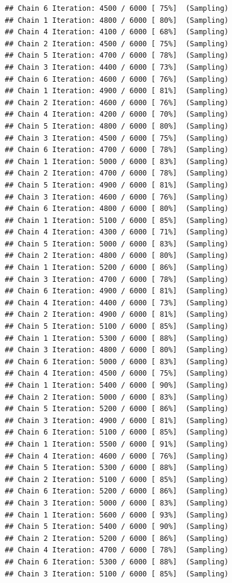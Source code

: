 \documentclass[
]{article}
\begin{document}
\begin{verbatim}
## Chain 6 Iteration: 4500 / 6000 [ 75%]  (Sampling) 
## Chain 1 Iteration: 4800 / 6000 [ 80%]  (Sampling) 
## Chain 4 Iteration: 4100 / 6000 [ 68%]  (Sampling) 
## Chain 2 Iteration: 4500 / 6000 [ 75%]  (Sampling) 
## Chain 5 Iteration: 4700 / 6000 [ 78%]  (Sampling) 
## Chain 3 Iteration: 4400 / 6000 [ 73%]  (Sampling) 
## Chain 6 Iteration: 4600 / 6000 [ 76%]  (Sampling) 
## Chain 1 Iteration: 4900 / 6000 [ 81%]  (Sampling) 
## Chain 2 Iteration: 4600 / 6000 [ 76%]  (Sampling) 
## Chain 4 Iteration: 4200 / 6000 [ 70%]  (Sampling) 
## Chain 5 Iteration: 4800 / 6000 [ 80%]  (Sampling) 
## Chain 3 Iteration: 4500 / 6000 [ 75%]  (Sampling) 
## Chain 6 Iteration: 4700 / 6000 [ 78%]  (Sampling) 
## Chain 1 Iteration: 5000 / 6000 [ 83%]  (Sampling) 
## Chain 2 Iteration: 4700 / 6000 [ 78%]  (Sampling) 
## Chain 5 Iteration: 4900 / 6000 [ 81%]  (Sampling) 
## Chain 3 Iteration: 4600 / 6000 [ 76%]  (Sampling) 
## Chain 6 Iteration: 4800 / 6000 [ 80%]  (Sampling) 
## Chain 1 Iteration: 5100 / 6000 [ 85%]  (Sampling) 
## Chain 4 Iteration: 4300 / 6000 [ 71%]  (Sampling) 
## Chain 5 Iteration: 5000 / 6000 [ 83%]  (Sampling) 
## Chain 2 Iteration: 4800 / 6000 [ 80%]  (Sampling) 
## Chain 1 Iteration: 5200 / 6000 [ 86%]  (Sampling) 
## Chain 3 Iteration: 4700 / 6000 [ 78%]  (Sampling) 
## Chain 6 Iteration: 4900 / 6000 [ 81%]  (Sampling) 
## Chain 4 Iteration: 4400 / 6000 [ 73%]  (Sampling) 
## Chain 2 Iteration: 4900 / 6000 [ 81%]  (Sampling) 
## Chain 5 Iteration: 5100 / 6000 [ 85%]  (Sampling) 
## Chain 1 Iteration: 5300 / 6000 [ 88%]  (Sampling) 
## Chain 3 Iteration: 4800 / 6000 [ 80%]  (Sampling) 
## Chain 6 Iteration: 5000 / 6000 [ 83%]  (Sampling) 
## Chain 4 Iteration: 4500 / 6000 [ 75%]  (Sampling) 
## Chain 1 Iteration: 5400 / 6000 [ 90%]  (Sampling) 
## Chain 2 Iteration: 5000 / 6000 [ 83%]  (Sampling) 
## Chain 5 Iteration: 5200 / 6000 [ 86%]  (Sampling) 
## Chain 3 Iteration: 4900 / 6000 [ 81%]  (Sampling) 
## Chain 6 Iteration: 5100 / 6000 [ 85%]  (Sampling) 
## Chain 1 Iteration: 5500 / 6000 [ 91%]  (Sampling) 
## Chain 4 Iteration: 4600 / 6000 [ 76%]  (Sampling) 
## Chain 5 Iteration: 5300 / 6000 [ 88%]  (Sampling) 
## Chain 2 Iteration: 5100 / 6000 [ 85%]  (Sampling) 
## Chain 6 Iteration: 5200 / 6000 [ 86%]  (Sampling) 
## Chain 3 Iteration: 5000 / 6000 [ 83%]  (Sampling) 
## Chain 1 Iteration: 5600 / 6000 [ 93%]  (Sampling) 
## Chain 5 Iteration: 5400 / 6000 [ 90%]  (Sampling) 
## Chain 2 Iteration: 5200 / 6000 [ 86%]  (Sampling) 
## Chain 4 Iteration: 4700 / 6000 [ 78%]  (Sampling) 
## Chain 6 Iteration: 5300 / 6000 [ 88%]  (Sampling) 
## Chain 3 Iteration: 5100 / 6000 [ 85%]  (Sampling) 

\end{verbatim}
\end{document}
